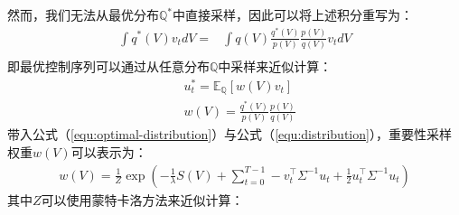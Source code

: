 然而，我们无法从最优分布$\mathbb{Q}^*$中直接采样，因此可以将上述积分重写为：
\begin{equation}
\begin{aligned}
    \int q^*(V) v_t dV=&\int q(V) \frac{q^*(V)}{p(V)} \frac{p(V)}{q(V)}v_t dV\\
\end{aligned}
\end{equation}
即最优控制序列可以通过从任意分布$\mathbb{Q}$中采样来近似计算：
\begin{equation}
\begin{aligned}
    &u_t^* = \mathbb{E}_{\mathbb{Q}}\left[w(V)v_t\right] \\
    &w(V) = \frac{q^*(V)}{p(V)} \frac{p(V)}{q(V)}
\end{aligned}
\end{equation}
带入公式（\ref{equ:optimal-distribution}）与公式（\ref{equ:distribution}），重要性采样权重$w(V)$可以表示为：
\begin{equation}
\begin{aligned}
    w(V)=\frac{1}{Z} \exp \left(-\frac{1}{\lambda}S(V) + \sum_{t=0}^{T-1} -v_t^\top \Sigma^{-1} u_t + \frac{1}{2} u_t^\top \Sigma^{-1} u_t \right)
\end{aligned}
\end{equation}
其中$Z$可以使用蒙特卡洛方法来近似计算：

